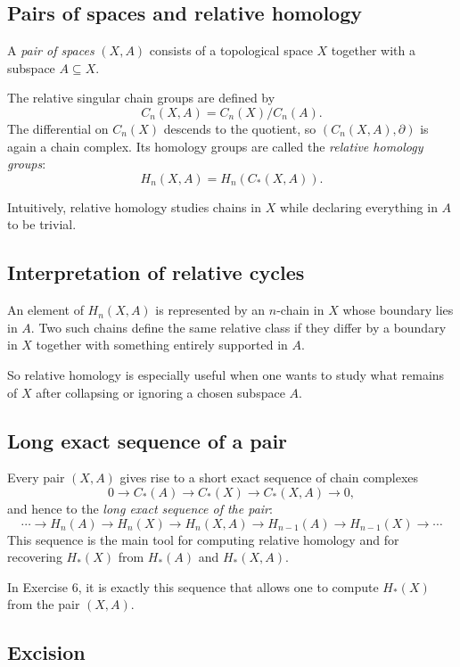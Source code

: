 \documentclass[12pt,a4paper]{article}
\theoremstyle{notespace}
\begin{document}
\subsection{Pairs of spaces and relative homology}

A \emph{pair of spaces} \((X,A)\) consists of a topological space \(X\) together with a subspace \(A\subseteq X\).

The relative singular chain groups are defined by
\[
C_n(X,A)=C_n(X)/C_n(A).
\]
The differential on \(C_n(X)\) descends to the quotient, so \((C_n(X,A),\partial)\) is again a chain complex. Its homology groups are called the \emph{relative homology groups}:
\[
H_n(X,A)=H_n(C_*(X,A)).
\]

Intuitively, relative homology studies chains in \(X\) while declaring everything in \(A\) to be trivial.

\subsection{Interpretation of relative cycles}

An element of \(H_n(X,A)\) is represented by an \(n\)-chain in \(X\) whose boundary lies in \(A\). Two such chains define the same relative class if they differ by a boundary in \(X\) together with something entirely supported in \(A\).

So relative homology is especially useful when one wants to study what remains of \(X\) after collapsing or ignoring a chosen subspace \(A\).

\subsection{Long exact sequence of a pair}

Every pair \((X,A)\) gives rise to a short exact sequence of chain complexes
\[
0\longrightarrow C_*(A)\longrightarrow C_*(X)\longrightarrow C_*(X,A)\longrightarrow 0,
\]
and hence to the \emph{long exact sequence of the pair}:
\[
\cdots \to H_n(A)\to H_n(X)\to H_n(X,A)\to H_{n-1}(A)\to H_{n-1}(X)\to \cdots
\]
This sequence is the main tool for computing relative homology and for recovering \(H_*(X)\) from \(H_*(A)\) and \(H_*(X,A)\).

In Exercise 6, it is exactly this sequence that allows one to compute \(H_*(X)\) from the pair \((X,A)\).

\subsection{Excision}
\end{document}
